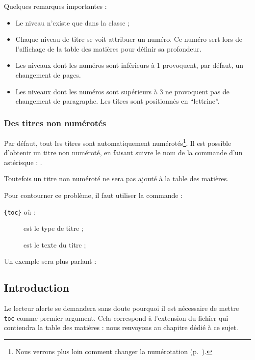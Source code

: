 Quelques remarques importantes :
\begin{itemize}
\item Le niveau  n'existe que dans la classe  ;
\item Chaque niveau de titre se voit attribuer un numéro. Ce numéro sert lors de l'affichage de la table des matières pour définir sa profondeur.\label{numeroniveau}
\item Les niveaux dont les numéros sont inférieurs à 1 provoquent, par défaut, un changement de pages.
\item Les niveaux dont les numéros sont supérieurs à 3 ne provoquent pas de changement de paragraphe. Les titres sont positionnés en \enquote{lettrine}.
\end{itemize}

\subsection{Des titres non numérotés}\label{titresansnumero}
Par défaut, tout les titres sont automatiquement numérotés\footnote{Nous verrons plus loin comment changer la numérotation (p.~\pageref{apparencecompteur}).}. Il est possible d'obtenir un titre non numéroté, en faisant suivre le nom de la commande d'un astérisque : .


Toutefois un titre non numéroté ne sera pas ajouté à la table des matières. 

Pour contourner ce problème, il faut utiliser la commande :

\verb|{toc}| où : \label{addcontentsline}

\begin{description}
    \item[] est le type de titre ;
    \item[] est le texte du titre ;
\end{description}

Un exemple sera plus parlant :


\begin{latexcode}
\chapter*{Introduction}
\end{latexcode}


\begin{plusloins}
Le lecteur alerte se demandera sans doute pourquoi il est nécessaire de mettre \verb|toc| comme premier argument. Cela correspond à l'extension du fichier qui contiendra la table des matières : nous renvoyons au chapitre dédié à ce sujet.
\end{plusloins}

